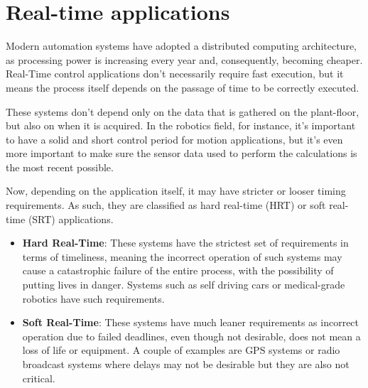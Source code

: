 \section{Real-time applications}

Modern automation systems have adopted a distributed computing architecture, as processing power is increasing every year and, consequently, becoming cheaper.
Real-Time control applications don't necessarily require fast execution, but it means the process itself depends on the passage of time to be correctly executed. \cite{technology:rte}

These systems don't depend only on the data that is gathered on the plant-floor, but also on when it is acquired.
In the robotics field, for instance, it's important to have a solid and short control period for motion applications, but it's even more important to make sure the sensor data used to perform the calculations is the most recent possible.

Now, depending on the application itself, it may have stricter or looser timing requirements.
As such, they are classified as hard real-time (HRT) or soft real-time (SRT) applications.

\begin{itemize}
	\item \textbf{Hard Real-Time}: These systems have the strictest set of requirements in terms of timeliness, meaning the incorrect operation of such systems may cause a catastrophic failure of the entire process, with the possibility of putting lives in danger. Systems such as self driving cars or medical-grade robotics have such requirements.

	\item \textbf{Soft Real-Time}: These systems have much leaner requirements as incorrect operation due to failed deadlines, even though not desirable, does not mean a loss of life or equipment. A couple of examples are GPS systems or radio broadcast systems where delays may not be desirable but they are also not critical.
\end{itemize}